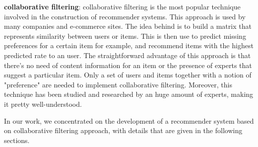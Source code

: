 \textbf{collaborative filtering}: collaborative filtering is the most popular technique involved in the construction of recommender systems. This approach is used by many companies and e-commerce sites. The idea behind is to build a matrix that represents similarity between users or items. This is then use to predict missing preferences for a certain item for example, and recommend items with the highest predicted rate to an user. The straightforward  advantage of this approach is that there's no need of content information for an item or the presence of experts that suggest a particular item. Only a set of users and items together with a notion of "preference" are needed to implement collaborative filtering. Moreover, this technique has been studied and researched by an huge amount of experts, making it pretty well-understood.

In our work, we concentrated on the development of a recommender system based on collaborative filtering approach, with details that are given in the following sections. 

